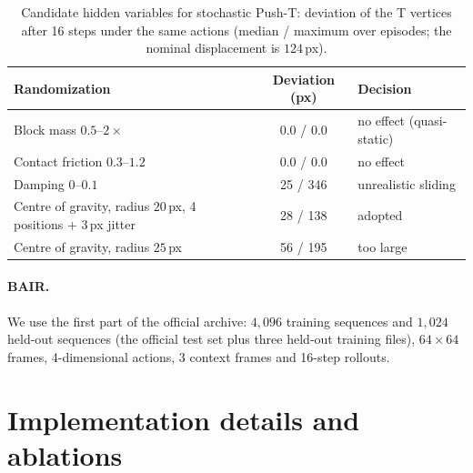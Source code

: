 \begin{table}[h]
\caption{Candidate hidden variables for stochastic Push-T: deviation of the T vertices after 16 steps under the same actions (median / maximum over episodes; the nominal displacement is $124$\,px).}
\label{tab:cog}
\begin{center}
\small
\begin{tabular}{lcl}
\toprule
Randomization & Deviation (px) & Decision \\
\midrule
Block mass $0.5$--$2\times$ & 0.0 / 0.0 & no effect (quasi-static) \\
Contact friction $0.3$--$1.2$ & 0.0 / 0.0 & no effect \\
Damping $0$--$0.1$ & 25 / 346 & unrealistic sliding \\
Centre of gravity, radius $20$\,px, 4 positions + 3\,px jitter & 28 / 138 & adopted \\
Centre of gravity, radius $25$\,px & 56 / 195 & too large \\
\bottomrule
\end{tabular}
\end{center}
\end{table}

\paragraph{BAIR.}
We use the first part of the official archive: $4{,}096$ training sequences and $1{,}024$ held-out sequences (the official test set plus three held-out training files), $64\times64$ frames, 4-dimensional actions, 3 context frames and 16-step rollouts.

\section{Implementation details and ablations}
\label{app:impl}

